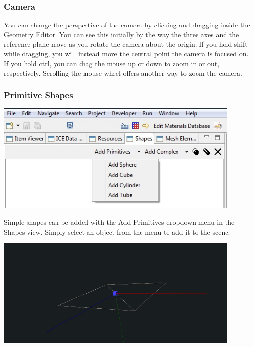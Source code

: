 \subsubsection{Camera}

You can change the perspective of the camera by clicking and dragging inside the
Geometry Editor. You can see this initially by the way the three axes and the
reference plane move as you rotate the camera about the origin. If you hold shift while dragging, you will instead move the central point the camera is focused on. If you hold ctrl, you can drag the mouse up or down to zoom in or out, respectively. Scrolling the mouse wheel offers another way to zoom the camera.

\subsubsection{Primitive Shapes}

\begin{center}
\includegraphics[width=12cm]{images/GeometryAddPrimitive.jpg}
\end{center}

Simple shapes can be added with the Add Primitives dropdown menu in the Shapes
view. Simply select an object from the menu to add it to the scene.

\begin{center}
\includegraphics[width=12cm]{images/GeometryAddCube.jpg}
\end{center}


